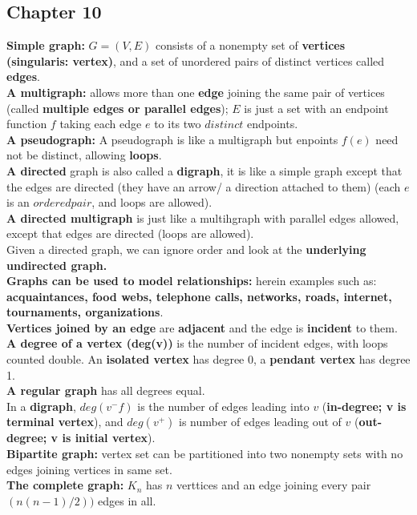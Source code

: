 \documentclass[12pt]{article}
\begin{document}
\subsection{Chapter 10} 
\textbf{Simple graph:} $G =(V,E)$ consists of a nonempty set of \textbf{vertices (singularis: vertex)}, and a set of unordered pairs of distinct vertices called \textbf{edges}. \\
\textbf{A multigraph:} allows more than one \textbf{edge} joining the same pair of vertices (called \textbf{multiple edges or parallel edges}); $E$ is just a set with an endpoint function $f$ taking each edge $e$ to its two $distinct$ endpoints. \\
\textbf{A pseudograph:} A pseudograph is like a multigraph but enpoints $f(e)$ need not be distinct, allowing \textbf{loops}. \\
\textbf{A directed} graph is also called a \textbf{digraph}, it is like a simple graph except that the edges are directed (they have an arrow/ a direction attached to them) (each $e$ is an $ordered pair$, and loops are allowed). \\
\textbf{A directed multigraph} is just like a multihgraph with parallel edges allowed, except that edges are directed (loops are allowed). \\
Given a directed graph, we can ignore order and look at the \textbf{underlying undirected graph.} \\
\textbf{Graphs can be used to model relationships:} herein examples such as: \textbf{acquaintances, food webs, telephone calls, networks, roads, internet, tournaments, organizations}. \\
\textbf{Vertices joined by an edge} are \textbf{adjacent} and the edge is \textbf{incident} to them. \\
\textbf{A degree of a vertex (deg(v))} is the number of incident edges, with loops counted double. An \textbf{isolated vertex} has degree 0, a \textbf{pendant vertex} has degree 1. \\
\textbf{A regular graph} has all degrees equal. \\
In a \textbf{digraph}, $deg(v^-f)$ is the number of edges leading into $v$ (\textbf{in-degree; v is terminal vertex}), and $deg(v^+)$ is number of edges leading out of $v$ (\textbf{out-degree; v is initial vertex}). \\
\textbf{Bipartite graph:} vertex set can be partitioned into two nonempty sets with no edges joining vertices in same set. \\
\textbf{The complete graph:} $K_n$ has $n$ verttices and an edge joining every pair $(n(n-1)/2))$ edges in all. \\
\end{document}
